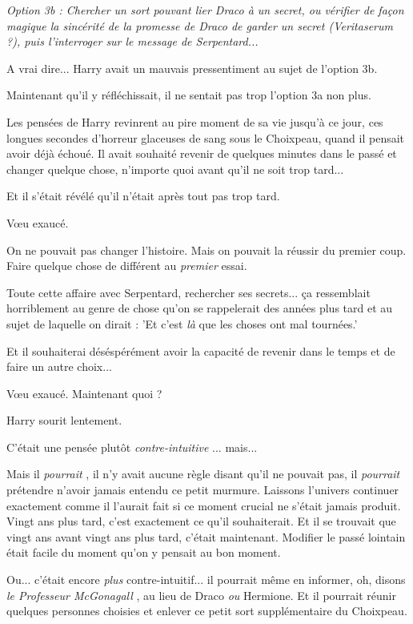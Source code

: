 \emph{Option 3b : Chercher un sort pouvant lier Draco à un secret, ou vérifier de façon magique la sincérité de la promesse de Draco de garder un secret (Veritaserum ?), puis l'interroger sur le message de Serpentard...} 

A vrai dire... Harry avait un mauvais pressentiment au sujet de l'option 3b.

Maintenant qu'il y réfléchissait, il ne sentait pas trop l'option 3a non plus.

Les pensées de Harry revinrent au pire moment de sa vie jusqu'à ce jour, ces longues secondes d'horreur glaceuses de sang sous le Choixpeau, quand il pensait avoir déjà échoué. Il avait souhaité revenir de quelques minutes dans le passé et changer quelque chose, n'importe quoi avant qu'il ne soit trop tard...

Et il s'était révélé qu'il n'était après tout pas trop tard.

Vœu exaucé.

On ne pouvait pas changer l'histoire. Mais on pouvait la réussir du premier coup. Faire quelque chose de différent au \emph{premier}  essai.

Toute cette affaire avec Serpentard, rechercher ses secrets... ça ressemblait horriblement au genre de chose qu'on se rappelerait des années plus tard et au sujet de laquelle on dirait : 'Et c'est \emph{là}  que les choses ont mal tournées.'

Et il souhaiterai déséspérément avoir la capacité de revenir dans le temps et de faire un autre choix...

Vœu exaucé. Maintenant quoi ?

Harry sourit lentement.

C'était une pensée plutôt \emph{contre-intuitive} ... mais...

Mais il \emph{pourrait} , il n'y avait aucune règle disant qu'il ne pouvait pas, il \emph{pourrait}  prétendre n'avoir jamais entendu ce petit murmure. Laissons l'univers continuer exactement comme il l'aurait fait si ce moment crucial ne s'était jamais produit. Vingt ans plus tard, c'est exactement ce qu'il souhaiterait. Et il se trouvait que vingt ans avant vingt ans plus tard, c'était maintenant. Modifier le passé lointain était facile du moment qu'on y pensait au bon moment.

Ou... c'était encore \emph{plus}  contre-intuitif... il pourrait même en informer, oh, disons \emph{le Professeur McGonagall} , au lieu de Draco \emph{ou}  Hermione. Et il pourrait réunir quelques personnes choisies et enlever ce petit sort supplémentaire du Choixpeau.

